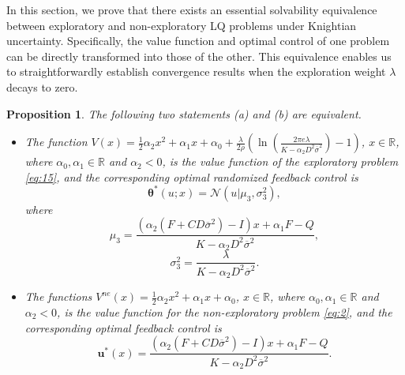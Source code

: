\documentclass[onecolumn, journal]{IEEEtran} %
\newtheorem{proposition}{Proposition}
\begin{document}
	In this section, we prove that there exists an essential solvability equivalence between exploratory and non-exploratory LQ problems under Knightian uncertainty. Specifically, the value function and optimal control of one problem can be directly transformed into those of the other. This equivalence enables us to straightforwardly establish convergence results when the exploration weight $\lambda$ decays to zero.
	\begin{proposition}
		The following two statements (a) and (b) are equivalent.
		\begin{itemize}
			\item[(a)] The function \(V(x) = \frac{1}{2}\alpha_2 x^2 + \alpha_1 x + \alpha_0 + \frac{\lambda}{2\rho}\left(\ln\left(\frac{2\pi e \lambda}{K - \alpha_2 D^2 \overline{\sigma}^2}\right) - 1\right)\), \(x \in \mathbb{R}\), where \(\alpha_0, \alpha_1 \in \mathbb{R}\) and \(\alpha_2 < 0\), is the value function of the exploratory problem \eqref{eq:15}, and the corresponding optimal randomized feedback control is
			\begin{equation*}
				\boldsymbol{\theta}^*(u;x) = \mathcal{N} \left( u \big|\mu_3, \sigma_3^2 \right), 
			\end{equation*}
			where
			\[
			\mu_3 = \frac{(\alpha_2(F + CD\overline{\sigma}^2) - I)x + \alpha_1F - Q}{K - \alpha_2D^2\overline{\sigma}^2},\]
			\[\sigma_3^2 = \frac{\lambda}{K - \alpha_2D^2\overline{\sigma}^2}.
			\]
			
			\item[(b)] The functions \(V^{ne}(x) = \frac{1}{2}\alpha_2 x^2 + \alpha_1 x + \alpha_0\), \(x \in \mathbb{R}\), where \(\alpha_0, \alpha_1 \in \mathbb{R}\) and \(\alpha_2 < 0\), is the value function for the non-exploratory problem \eqref{eq:2}, and the corresponding optimal feedback control is
			\[
			\boldsymbol{u}^*(x) = \frac{(\alpha_2(F + CD\overline{\sigma}^2) - I)x + \alpha_1 F - Q}{K - \alpha_2 D^2 \overline{\sigma}^2}.
			\]
		\end{itemize}
	\end{proposition}
	
\end{document}
